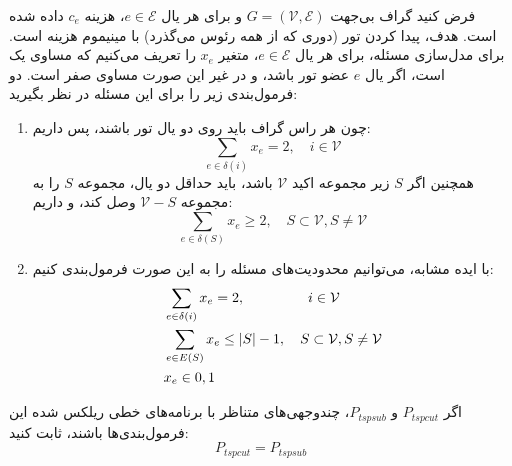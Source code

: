 فرض کنید گراف بی‌جهت
$G = (\mathcal{V}, \mathcal{E})$
و برای هر یال
$e \in \mathcal{E}$،
هزینه
$c_e$
داده شده است. هدف، پیدا کردن تور (دوری که از همه‌ رئوس می‌گذرد) با مینیموم هزینه است. برای مدل‌سازی مسئله، برای هر یال
$e \in \mathcal{E}$،
متغیر
$x_e$
را تعریف می‌کنیم که مساوی یک است، اگر یال
$e$
عضو تور باشد، و در غیر این صورت مساوی صفر است. دو فرمول‌بندی زیر را برای این مسئله در نظر بگیرید:
\begin{enumerate}
    \item
    چون هر راس گراف باید روی دو یال تور باشند، پس داریم:
    \[
    \sum_{e \in \delta (i)} x_e = 2, \quad i \in \mathcal{V}    
    \]
    همچنین اگر
    $S$
    زیر مجموعه اکید
    $\mathcal{V}$
    باشد، باید حداقل دو یال، مجموعه
    $S$
    را به مجموعه
    $\mathcal{V} - S$
    وصل کند، و داریم:
    \[
    \sum_{e \in \delta (S)} x_e \geq 2, \quad S \subset \mathcal{V}, S \ne \mathcal{V}    
    \]

    \item
    با ایده مشابه، می‌توانیم محدودیت‌های مسئله را به این صورت فرمول‌بندی کنیم:
    \begin{align*}
        &\sum_{e \in \delta (i)} x_e = 2, \hspace*{45pt} i \in \mathcal{V} \\
        &\sum_{e \in E(S)} x_e \leq |S| - 1, \quad S \subset \mathcal{V}, S \ne \mathcal{V} \\
        &x_e \in 0, 1
    \end{align*}
\end{enumerate}
اگر
$P_{tspcut}$
و
$P_{tspsub}$،
چندوجهی‌های متناظر با برنامه‌های خطی ریلکس‌ شده این فرمول‌بندی‌ها باشند، ثابت کنید:
\[
    P_{tspcut} = P_{tspsub}    
\]